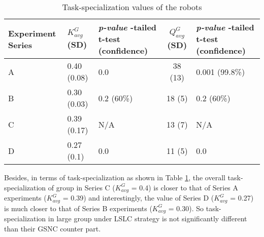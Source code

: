 \begin{table}[H]
\begin{center}
\caption{Task-specialization values of the robots}
\begin{tabular}{|p{0.7in}|p{0.7in}|m{0.7in}|c|m{0.7in}|}
\hline Experiment \protect\newline Series & $ K^G_{avg}$ (SD) & \textit{ p-value} \protect\newline 1-tailed t-test (confidence)  & $ Q^G_{avg}$ (SD) & \textit{ p-value} \protect\newline 1-tailed t-test \protect\newline (confidence) \\ 
\hline A & 0.40 (0.08)& 0.0 & 38 (13) & 0.001 (99.8\%)\\ 
\hline B &  0.30 (0.03) & 0.2 (60\%) &  18 (5) & 0.2 (60\%)\\
\hline C  & 0.39 (0.17) & N/A & 13 (7) & N/A \\
\hline D  & 0.27 (0.1)& 0.0 & 11 (5) & 0.0\\
\hline
\end{tabular}
\label{table:k-cmp} 
\end{center}
\end{table}
Besides, in terms of task-specialization as shown in Table \ref{table:k-cmp}, the overall task-specialization of group in Series C ($K^G_{avg}$ = 0.4) is  closer to that of Series A experiments ($K^G_{avg}$ = 0.39) and interestingly, the value of  Series D ($K^G_{avg}$ = 0.27) is  much closer to that of Series B experiments ($K^G_{avg}$ = 0.30). So task-specialization in large group under LSLC strategy is not significantly different than their GSNC counter part. %

